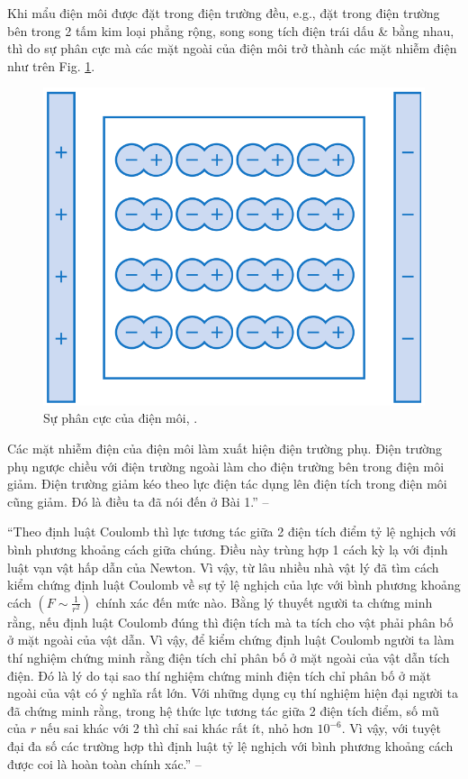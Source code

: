 \documentclass[oneside]{book}
\numberwithin{equation}{section}
\begin{document}
Khi mẩu điện môi được đặt trong điện trường đều, e.g., đặt trong điện trường bên trong 2 tấm kim loại phẳng rộng, song song tích điện trái dấu \& bằng nhau, thì do sự phân cực mà các mặt ngoài của điện môi trở thành các mặt nhiễm điện như trên Fig. \ref{fig:phan_cuc_dien_moi}.

\begin{figure}[H]
	\centering
	\includegraphics[scale=0.15]{phan_cuc_dien_moi}
	\caption{Sự phân cực của điện môi, \cite[Hình 6.5, p. 30]{SGK_Vat_Ly_11_nang_cao}.}
	\label{fig:phan_cuc_dien_moi}
\end{figure}
Các mặt nhiễm điện của điện môi làm xuất hiện điện trường phụ. Điện trường phụ ngược chiều với điện trường ngoài làm cho điện trường bên trong điện môi giảm. Điện trường giảm kéo theo lực điện tác dụng lên điện tích trong điện môi cũng giảm. Đó là điều ta đã nói đến ở Bài 1.'' -- \cite[p. 30]{SGK_Vat_Ly_11_nang_cao}

``Theo định luật Coulomb thì lực tương tác giữa 2 điện tích điểm tỷ lệ nghịch với bình phương khoảng cách giữa chúng. Điều này trùng hợp 1 cách kỳ lạ với định luật vạn vật hấp dẫn của Newton. Vì vậy, từ lâu nhiều nhà vật lý đã tìm cách kiểm chứng định luật Coulomb về sự tỷ lệ nghịch của lực với bình phương khoảng cách $\left(F\sim\frac{1}{r^2}\right)$ chính xác đến mức nào. Bằng lý thuyết người ta chứng minh rằng, nếu định luật Coulomb đúng thì điện tích mà ta tích cho vật phải phân bố ở mặt ngoài của vật dẫn. Vì vậy, để kiểm chứng định luật Coulomb người ta làm thí nghiệm chứng minh rằng điện tích chỉ phân bố ở mặt ngoài của vật dẫn tích điện. Đó là lý do tại sao thí nghiệm chứng minh điện tích chỉ phân bố ở mặt ngoài của vật có ý nghĩa rất lớn. Với những dụng cụ thí nghiệm hiện đại người ta đã chứng minh rằng, trong hệ thức lực tương tác giữa 2 điện tích điểm, số mũ của $r$ nếu sai khác với 2 thì chỉ sai khác rất ít, nhỏ hơn $10^{-6}$. Vì vậy, với tuyệt đại đa số các trường hợp thì định luật tỷ lệ nghịch với bình phương khoảng cách được coi là hoàn toàn chính xác.'' -- \cite[p. 31]{SGK_Vat_Ly_11_nang_cao}
\end{document}
